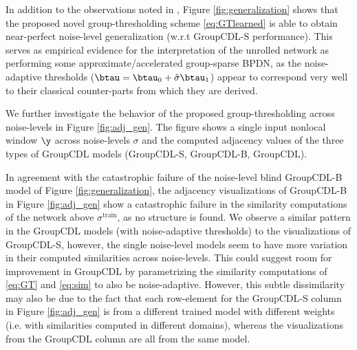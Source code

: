 \documentclass[lettersize,journal]{IEEEtran}
\newcommand{\sigmatrain}{\sigma^{\mathrm{train}}}
\begin{document}
In addition to the observations noted in \cite{janjusevicCDLNet2022}, Figure
\ref{fig:generalization} shows that the proposed novel group-thresholding
scheme \eqref{eq:GTlearned} is able to obtain near-perfect noise-level
generalization (w.r.t GroupCDL-S performance). This serves as empirical evidence for
the interpretation of the unrolled network as performing some
approximate/accelerated group-sparse BPDN, as the noise-adaptive thresholds
($\btau = \btau_0 + \hat{\sigma}\btau_1$) appear to correspond very well to
their classical counter-parts from which they are derived. 

We further investigate the behavior of the proposed group-thresholding across
noise-levels in Figure \ref{fig:adj_gen}. The figure shows a single input nonlocal
window $\y$ across noise-levels $\sigma$ and the computed adjacency values of
the three types of GroupCDL models (GroupCDL-S, GroupCDL-B, GroupCDL). 

In agreement with the catastrophic failure of the noise-level blind GroupCDL-B
model of Figure \ref{fig:generalization}, the adjacency visualizations of
GroupCDL-B in Figure \ref{fig:adj_gen} show a catastrophic failure in the
similarity computations of the network above $\sigmatrain$, as no structure is
found. We observe a similar pattern in the
GroupCDL models (with noise-adaptive thresholds) to the visualizations of
GroupCDL-S, however, the single noise-level models seem to have more variation
in their computed similarities across noise-levels.
This could suggest room for improvement in GroupCDL by parametrizing the similarity computations
of \eqref{eq:GT} and \eqref{eq:sim} to also be noise-adaptive. However, this subtle
dissimilarity may also be due to the fact that each row-element for the GroupCDL-S
column in Figure \ref{fig:adj_gen} is from a different trained model with
different weights (i.e. with similarities computed in different domains),
whereas the visualizations from the GroupCDL column are all from the same model.
\end{document}
